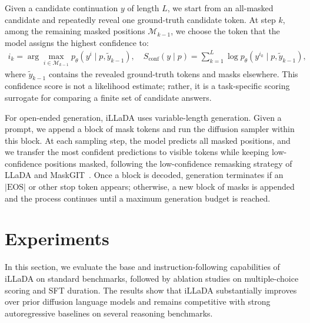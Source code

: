 \documentclass[]{bytedance_seed}
\begin{document}
Given a candidate continuation \(y\) of length \(L\), we start from an all-masked candidate and repeatedly reveal one ground-truth candidate token. At step \(k\), among the remaining masked positions \(\mathcal{M}_{k-1}\), we choose the token that the model assigns the highest confidence to:
\begin{align}
\label{eq:confidence-score}
i_k
=
\arg\max_{i \in \mathcal{M}_{k-1}}
p_{\theta}(y^i \mid p, \tilde{y}_{k-1}),
\quad
S_{\mathrm{conf}}(y \mid p)
=
\sum_{k=1}^{L}
\log p_{\theta}(y^{i_k} \mid p, \tilde{y}_{k-1}),
\end{align}
where \(\tilde{y}_{k-1}\) contains the revealed ground-truth tokens and masks elsewhere. This confidence score is not a likelihood estimate; rather, it is a task-specific scoring surrogate for comparing a finite set of candidate answers.

For open-ended generation, iLLaDA uses variable-length generation. Given a prompt, we append a block of mask tokens and run the diffusion sampler within this block. At each sampling step, the model predicts all masked positions, and we transfer the most confident predictions to visible tokens while keeping low-confidence positions masked, following the low-confidence remasking strategy of LLaDA and MaskGIT~\citep{chang2022maskgit}. Once a block is decoded, generation terminates if an \( |\text{EOS}| \) or other stop token appears; otherwise, a new block of masks is appended and the process continues until a maximum generation budget is reached. 




\section{Experiments}
\label{sec:experiments}

In this section, we evaluate the base and instruction-following capabilities of iLLaDA on standard benchmarks, followed by ablation studies on multiple-choice scoring and SFT duration. The results show that iLLaDA substantially improves over prior diffusion language models and remains competitive with strong autoregressive baselines on several reasoning benchmarks.
\end{document}
